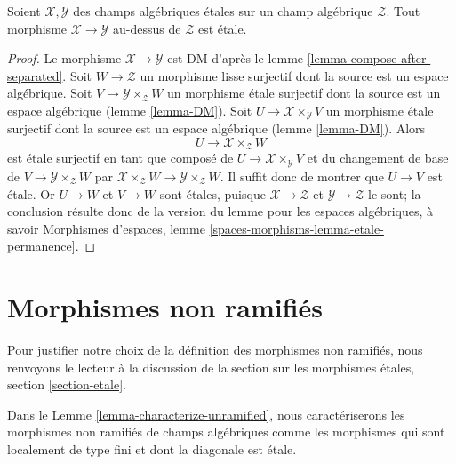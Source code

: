 \begin{lemma}
\label{lemma-etale-permanence}
Soient $\mathcal{X}, \mathcal{Y}$ des champs alg\'ebriques \'etales sur
un champ alg\'ebrique $\mathcal{Z}$. Tout morphisme
$\mathcal{X} \to \mathcal{Y}$ au-dessus de $\mathcal{Z}$ est \'etale.
\end{lemma}

\begin{proof}
Le morphisme $\mathcal{X} \to \mathcal{Y}$ est DM d'apr\`es
le lemme \ref{lemma-compose-after-separated}.
Soit $W \to \mathcal{Z}$ un morphisme lisse surjectif
dont la source est un espace alg\'ebrique. Soit
$V \to \mathcal{Y} \times_\mathcal{Z} W$ un morphisme \'etale surjectif
dont la source est un espace alg\'ebrique
(lemme \ref{lemma-DM}).
Soit $U \to \mathcal{X} \times_\mathcal{Y} V$ un morphisme \'etale surjectif
dont la source est un espace alg\'ebrique
(lemme \ref{lemma-DM}).
Alors
$$
U \longrightarrow \mathcal{X} \times_\mathcal{Z} W
$$
est \'etale surjectif en tant que compos\'e de
$U \to \mathcal{X} \times_\mathcal{Y} V$
et du changement de base de $V \to \mathcal{Y} \times_\mathcal{Z} W$
par $\mathcal{X} \times_\mathcal{Z} W \to \mathcal{Y} \times_\mathcal{Z} W$.
Il suffit donc de montrer que $U \to V$ est \'etale.
Or $U \to W$ et $V \to W$ sont \'etales, puisque
$\mathcal{X} \to \mathcal{Z}$ et $\mathcal{Y} \to \mathcal{Z}$
le sont; la conclusion r\'esulte donc de la version du lemme pour les
espaces alg\'ebriques, \`a savoir
Morphismes d'espaces, lemme \ref{spaces-morphisms-lemma-etale-permanence}.
\end{proof}








\section{Morphismes non ramifi\'es}
\label{section-unramified}

\noindent
Pour justifier notre choix de la d\'efinition des morphismes
non ramifi\'es, nous renvoyons le lecteur \`a la discussion
de la section sur les morphismes \'etales, section \ref{section-etale}.

\medskip\noindent
Dans le Lemme \ref{lemma-characterize-unramified}, nous caract\'eriserons
les morphismes non ramifi\'es de champs alg\'ebriques comme les morphismes
qui sont localement de type fini et dont la diagonale est \'etale.

